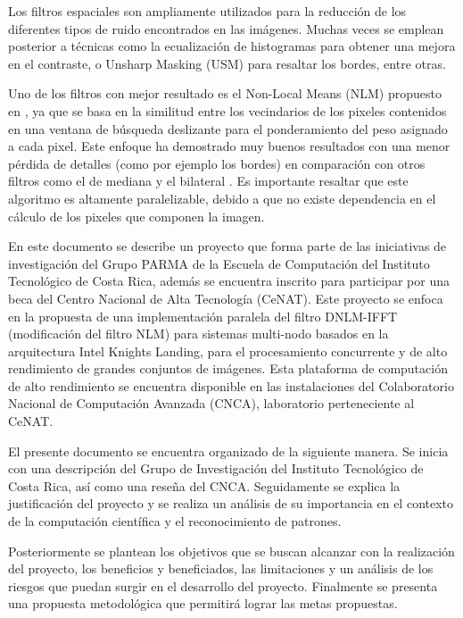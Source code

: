 Los filtros espaciales son ampliamente utilizados para la reducci\'on de los diferentes tipos de ruido encontrados en las im\'agenes. Muchas veces se emplean posterior a t\'ecnicas como la ecualizaci\'on de histogramas para obtener una mejora en el contraste, o Unsharp Masking (USM) para resaltar los bordes, entre otras.

Uno de los filtros con mejor resultado es el Non-Local Means (NLM) propuesto en \textcite{1467423}, ya que se basa en la similitud entre los vecindarios de los pixeles contenidos en una ventana de búsqueda deslizante para el ponderamiento del peso asignado a cada pixel. Este enfoque ha demostrado muy buenos resultados con una menor p\'erdida de detalles (como por ejemplo los bordes) en comparaci\'on con otros filtros como el de mediana y el bilateral \cite{calderon2016first}. Es importante resaltar que este algoritmo es altamente paralelizable, debido a que no existe dependencia en el c\'alculo de los pixeles que componen la imagen. 

En este documento se describe un proyecto que forma parte de las iniciativas de investigaci\'on del Grupo PARMA de la Escuela de Computaci\'on del Instituto Tecnol\'ogico de Costa Rica, adem\'as se encuentra inscrito para participar por una beca del Centro Nacional de Alta Tecnolog\'ia (CeNAT). Este proyecto se enfoca en la propuesta de una implementaci\'on paralela del filtro DNLM-IFFT (modificaci\'on del filtro NLM) para sistemas multi-nodo basados en la arquitectura Intel Knights Landing, para el procesamiento concurrente y de alto rendimiento de grandes conjuntos de im\'agenes. Esta plataforma de computaci\'on de alto rendimiento se encuentra disponible en las instalaciones del Colaboratorio Nacional de Computaci\'on Avanzada (CNCA), laboratorio perteneciente al CeNAT.

El presente documento se encuentra organizado de la siguiente manera. Se inicia con una descripci\'on del Grupo de Investigaci\'on del Instituto Tecnol\'ogico de Costa Rica, as\'i como una rese\~na del CNCA. Seguidamente se explica la justificaci\'on del proyecto y se realiza un an\'alisis de su importancia en el contexto de la computaci\'on cient\'ifica y el reconocimiento de patrones. 

Posteriormente se plantean los objetivos que se buscan alcanzar con la realizaci\'on del proyecto, los beneficios y beneficiados, las limitaciones y un an\'alisis de los riesgos que puedan surgir en el desarrollo del proyecto. Finalmente se presenta una propuesta metodol\'ogica que permitir\'a lograr las metas propuestas.

